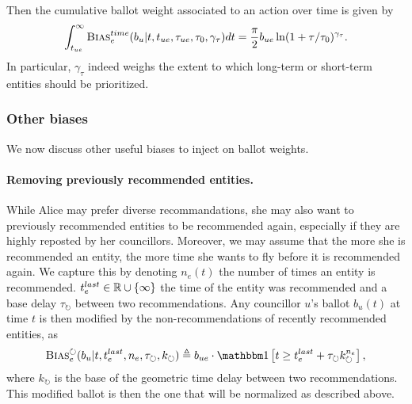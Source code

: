\begin{proposition}
    \label{prop:cumulative_weight}
    Then the cumulative ballot weight associated to an action over time is given by
    \begin{align}
        \int_{t_{ue}}^\infty \textsc{Bias}^{time}_e (
            b_u | t, t_{ue}, \tau_{ue}, \tau_0, \gamma_\tau
        ) dt
        = \frac{\pi}{2} b_{ue} \ln (1 + \tau/\tau_0)^{\gamma_\tau}.
    \end{align}
    In particular, $\gamma_\tau$ indeed weighs the extent to which
    long-term or short-term entities should be prioritized.
\end{proposition}



\subsubsection{Other biases}

We now discuss other useful biases to inject on ballot weights.

\paragraph{Removing previously recommended entities.}
While Alice may prefer diverse recommandations,
she may also want to previously recommended entities to be recommended again,
especially if they are highly reposted by her councillors.
Moreover, we may assume that the more she is recommended an entity,
the more time she wants to fly before it is recommended again.
We capture this by denoting $n_e(t)$ the number of times an entity is recommended.
$t^{last}_e \in \mathbb R \cup \left\lbrace \infty \right\rbrace$ the time of the entity was recommended
and a base delay $\tau_\circlearrowright$ between two recommendations.
Any councillor $u$'s ballot $b_u(t)$ at time $t$ is then modified 
by the non-recommendations of recently recommended entities, as
\begin{align}
    \Bias^{\circlearrowright}_e (b_u | t, t^{last}_e, n_e, \tau_\circlearrowright, k_\circlearrowright) \triangleq
    b_{ue} \cdot \indicator{
        t \geq t^{last}_e + \tau_\circlearrowright k_\circlearrowright^{n_e}
    },
\end{align}
where $k_\circlearrowright$ is the base of the geometric time delay between two recommendations.
This modified ballot is then the one that will be normalized as described above.

